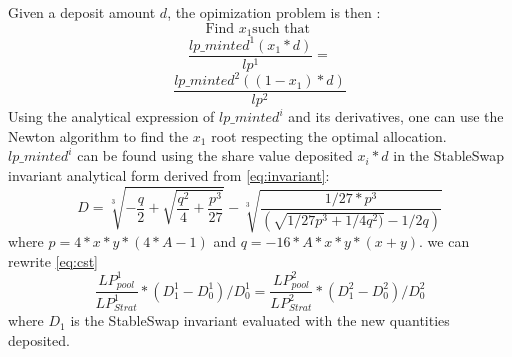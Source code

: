 \documentclass[conference]{IEEEtran}
\begin{document}
Given a deposit amount $d$, the opimization problem is then :
\begin{equation}
\text{Find } x_1 \text{such that }
\end{equation}
$$
\frac{lp\_minted^1(x_1*d)}{lp^1}  = 
$$
$$
\frac{lp\_minted^2((1-x_1)*d)}{lp^2}
$$
Using the analytical expression of $lp\_minted^i$ and its derivatives, one can use the Newton algorithm to find the $x_1$ root respecting the optimal allocation. $lp\_minted^i$ can be found using the share value deposited $x_i*d$ in the StableSwap invariant analytical form derived from \ref{eq:invariant}:\\
\begin{equation}
D = \sqrt[3]{-\frac{q}{2}+\sqrt{\frac{q^2}{4}+\frac{p^3}{27}}}- 
    \sqrt[3]{\frac{1/27*p^3}{(\sqrt{1/27 p^3 + 1/4 q^2)} - 1/2q)}}
\end{equation} where $p = 4*x*y*(4*A-1)$ and $q =-16*A*x*y*(x+y)$.
 we can rewrite \ref{eq:cst}
 \begin{equation}
\frac{LP^1_{pool} }{LP^1_{Strat} }* ( D^1_1 -D^1_0)/D^1_0 = \frac{LP^2_{pool} }{LP^2_{Strat} }* ( D^2_1 -D^2_0)/D^2_0
 \end{equation}
 where 
 $D_1$ is the StableSwap invariant evaluated with the new quantities deposited.  
\end{document}
